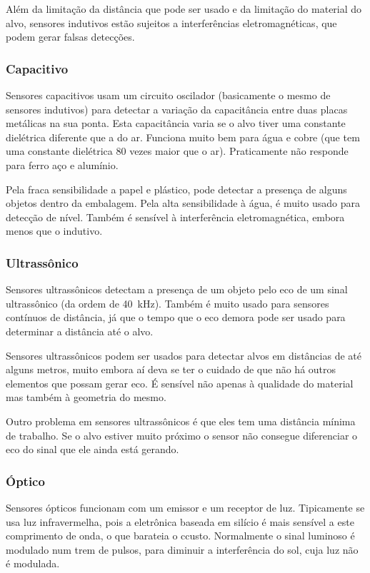 Além da limitação da distância que pode ser usado e da limitação do material do alvo, sensores indutivos estão sujeitos a interferências eletromagnéticas, que podem gerar falsas detecções.

\subsubsection{Capacitivo}
\label{subs:Capacitivo}

Sensores capacitivos usam um circuito oscilador (basicamente o mesmo de sensores indutivos) para detectar a variação da capacitância entre duas placas metálicas na sua ponta. Esta capacitância varia se o alvo tiver uma constante dielétrica diferente que a do ar. Funciona muito bem para água e cobre (que tem uma constante dielétrica 80 vezes maior que o ar). Praticamente não responde para ferro aço e alumínio.

Pela fraca sensibilidade a papel e plástico, pode detectar a presença de alguns objetos dentro da embalagem. Pela alta sensibilidade à água, é muito usado para detecção de nível. Também é sensível à interferência eletromagnética, embora menos que o indutivo.

\subsubsection{Ultrassônico}
\label{subs:Ultrassonico}

Sensores ultrassônicos detectam a presença de um objeto pelo eco de um sinal ultrassônico (da ordem de \SI{40}{kHz}). Também é muito usado para sensores contínuos de distância, já que o tempo que o eco demora pode ser usado para determinar a distância até o alvo.

Sensores ultrassônicos podem ser usados para detectar alvos em distâncias de até alguns metros, muito embora aí deva se ter o cuidado de que não há outros elementos que possam gerar eco. É sensível não apenas à qualidade do material mas também à geometria do mesmo.

Outro problema em sensores ultrassônicos é que eles tem uma distância mínima de trabalho. Se o alvo estiver muito próximo o sensor não consegue diferenciar o eco do sinal que ele ainda está gerando.

\subsubsection{Óptico}
\label{subs:optico}

Sensores ópticos funcionam com um emissor e um receptor de luz. Tipicamente se usa luz infravermelha, pois a eletrônica baseada em silício é mais sensível a este comprimento de onda, o que barateia o ccusto. Normalmente o sinal luminoso é modulado num trem de pulsos, para diminuir a interferência do sol, cuja luz não é modulada.

